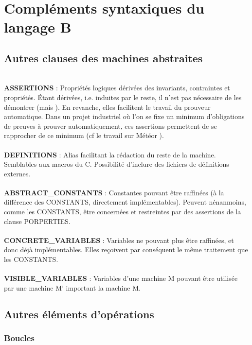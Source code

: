 \documentclass[10pt,a4paper]{article}
\begin{document}
{\begin{itemize}
\end{itemize}

\section{Compléments syntaxiques du langage B}
\label{ComplementSyntaxique}
\subsection{Autres clauses des machines abstraites}
~\\\noindent\textbf{ASSERTIONS} : Propriétés logiques dérivées des invariants, contraintes et propriétés. Étant dérivées, i.e. induites par le reste, il n'est pas nécessaire de les démontrer (mais ). En revanche, elles facilitent le travail du prouveur automatique. Dans un projet industriel où l'on se fixe un minimum d'obligations de preuves à prouver automatiquement, ces assertions permettent de se rapprocher de ce minimum (cf le travail sur Météor \cite{behm1999meteor}).
\\~\\\noindent\textbf{DEFINITIONS} : Alias facilitant la rédaction du reste de la machine. Semblables aux macros du C. Possibilité d'inclure des fichiers de définitions externes.
\\~\\\noindent\textbf{ABSTRACT\_CONSTANTS} : Constantes pouvant être raffinées (à la différence des CONSTANTS, directement implémentables). Peuvent nénanmoins, comme les CONSTANTS, être concernées et restreintes par des assertions de la clause PORPERTIES.
\\~\\\noindent\textbf{CONCRETE\_VARIABLES} : Variables ne pouvant plus être raffinées, et donc déjà implémentables. Elles reçoivent par conséquent le même traitement que les CONSTANTS.
\\~\\\noindent\textbf{VISIBLE\_VARIABLES} : Variables d'une machine M pouvant être utilisée par une machine M' important la machine M.

\subsection{Autres éléments d'opérations}

\subsubsection{Boucles}

}
\end{document}
